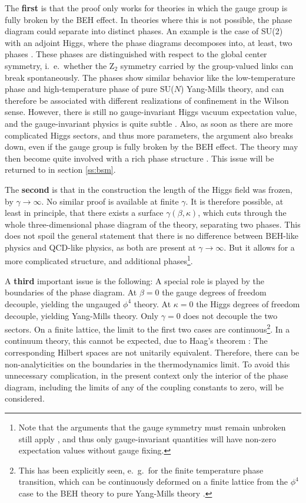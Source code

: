 \documentclass[final,twoside,12pt]{article}
\newcommand*{\1}{1\!\!\!\bot}
\begin{document}
The {\bf first} is that the proof only works for theories in which the gauge group is fully broken by the BEH effect. In theories where this is not possible, the phase diagram could separate into distinct phases. An example is the case of SU(2) with an adjoint Higgs, where the phase diagrams decomposes into, at least, two phases \cite{Baier:1986ni}. These phases are distinguished  with respect to the global center symmetry, i.\ e.\ whether the Z$_2$ symmetry carried by the group-valued links can break spontaneously. The phases show similar behavior like the low-temperature phase and high-temperature phase of pure SU($N$) Yang-Mills theory, and can therefore be associated with different realizations of confinement in the Wilson sense. However, there is still no gauge-invariant Higgs vacuum expectation value, and the gauge-invariant physics is quite subtle \cite{Maas:2017xzh,Kondo:2016ywd}. Also, as soon as there are more complicated Higgs sectors, and thus more parameters, the argument also breaks down, even if the gauge group is fully broken by the BEH effect. The theory may then become quite involved with a rich phase structure \cite{Branco:2011iw,Ivanov:2017dad,Lewis:2010ps,Maas:2016qpu,Maas:2014nya}. This issue will be returned to in section \ref{ss:bsm}.

The {\bf second} is that in the construction the length of the Higgs field was frozen, by $\gamma\to\infty$. No similar proof is available at finite $\gamma$. It is therefore possible, at least in principle, that there exists a surface $\gamma(\beta,\kappa)$, which cuts through the whole three-dimensional phase diagram of the theory, separating two phases. This does not spoil the general statement that there is no difference between BEH-like physics and QCD-like physics, as both are present at $\gamma\to\infty$. But it allows for a more complicated structure, and additional phases\footnote{Note that the arguments that the gauge symmetry must remain unbroken still apply \cite{Elitzur:1975im,Haag:1992hx}, and thus only gauge-invariant quantities will have non-zero expectation values without gauge fixing.}.

A {\bf third} important issue is the following: A special role is played by the boundaries of the phase diagram. At $\beta=0$ the gauge degrees of freedom decouple, yielding the ungauged $\phi^4$ theory. At $\kappa=0$ the Higgs degrees of freedom decouple, yielding Yang-Mills theory. Only $\gamma=0$ does not decouple the two sectors. On a finite lattice, the limit to the first two cases are continuous\footnote{This has been explicitly seen, e.\ g.\ for the finite temperature phase transition, which can be continuously deformed on a finite lattice from the $\phi^4$ case to the BEH theory to pure Yang-Mills theory \cite{Wellegehausen:2011sc}.}. In a continuum theory, this cannot be expected, due to Haag's theorem \cite{Haag:1992hx}: The corresponding Hilbert spaces are not unitarily equivalent. Therefore, there can be non-analyticities on the boundaries in the thermodynamics limit. To avoid this unnecessary complication, in the present context only the interior of the phase diagram, including the limits of any of the coupling constants to zero, will be considered.
\end{document}

